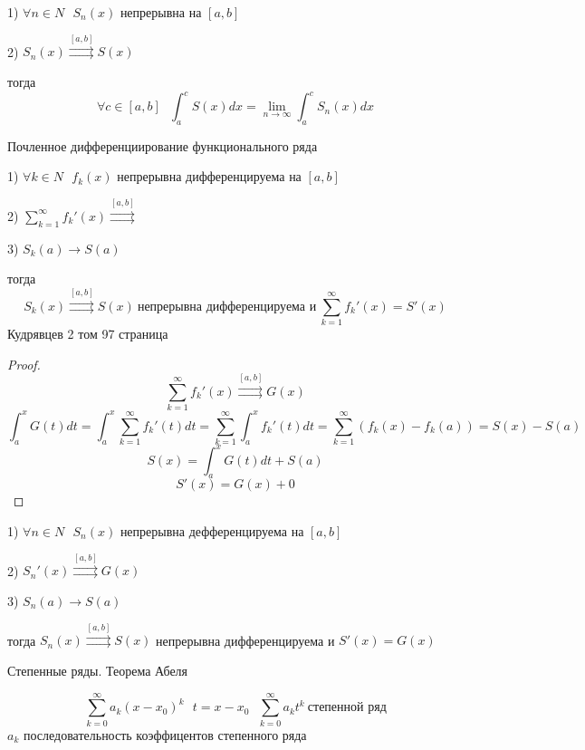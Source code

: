 \begin{theorem}
  1) $\forall n \in N ~~~ S_n(x)$ непрерывна на $[a,b]$

  2) $S_n(x) \stackrel{[a, b]}{\rightrightarrows} S(x)$

  тогда
  $$
  \forall c \in [a,b] ~~~ \int_a^c S(x)dx = \lim_{n \to \infty}
  \int_a^c S_n(x)dx
  $$
\end{theorem}

\begin{title}[\Large]
  Почленное дифференциирование функционального ряда
\end{title}

\begin{theorem}
  1) $\forall k \in N ~~~ f_k(x)$ непрерывна дифференцируема на $[a,b]$

  2) $\sum_{k=1}^{\infty} f_k'(x) \stackrel{[a, b]}{\rightrightarrows}$

  3) $S_k(a) \rightarrow S(a)$

  тогда
  $$
  S_k(x) \stackrel{[a, b]}{\rightrightarrows} S(x) ~
  \text{непрерывна дифференцируема и} ~ \sum_{k=1}^{\infty} f_k'(x) = S'(x)
  $$
  Кудрявцев 2 том 97 страница
\end{theorem}

\begin{proof}
  $$
  \sum_{k=1}^{\infty} f_k'(x) \stackrel{[a,b]}{\rightrightarrows} G(x)
  $$
  $$
  \int_a^x G(t)dt = \int_a^x \sum_{k=1}^{\infty} f_k'(t) dt =
  \sum_{k=1}^{\infty} \int_a^x f_k'(t) dt = \sum_{k=1}^{\infty}
  (f_k(x) - f_k(a)) = S(x) - S(a)
  $$
  $$
  S(x) = \int_a^x G(t)dt + S(a)
  $$
  $$
  S'(x) = G(x) + 0
  $$
\end{proof}

\begin{theorem}
  1) $\forall n \in N ~~~ S_n(x)$ непрерывна дефференцируема на $[a,b]$

  2) $S_n'(x) \stackrel{[a,b]}{\rightrightarrows} G(x)$

  3) $S_n(a) \to S(a)$

  тогда $S_n(x) \stackrel{[a,b]}{\rightrightarrows} S(x)$
  непрерывна дифференцируема и $S'(x) = G(x)$
\end{theorem}

\begin{title}[\Large]
  Степенные ряды. Теорема Абеля
\end{title}

\begin{define}
  $$
  \sum_{k=0}^{\infty} a_k (x-x_0)^k ~~~ t = x - x_0 ~~~
  \sum_{k=0}^{\infty} a_k t^k ~ \text{степенной ряд}
  $$
  $a_k$ последовательность коэффицентов степенного ряда
\end{define}

